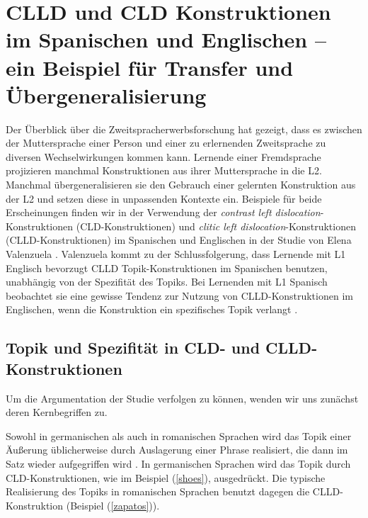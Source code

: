 \section{CLLD und CLD Konstruktionen im Spanischen und Englischen -- ein Beispiel für Transfer und Übergeneralisierung}


Der Überblick über die Zweitspracherwerbsforschung hat gezeigt, dass es zwischen der Muttersprache einer Person und einer zu erlernenden Zweitsprache zu diversen Wechselwirkungen kommen kann.
Lernende einer Fremdsprache projizieren manchmal Konstruktionen aus ihrer Muttersprache in die L2.
Manchmal übergeneralisieren sie den Gebrauch einer gelernten Konstruktion aus der L2 und setzen diese in unpassenden Kontexte ein.
Beispiele für beide Erscheinungen finden wir in der Verwendung der \textit{contrast left dislocation}-Konstruktionen (CLD-Konstruktionen) und \textit{clitic left dislocation}-Konstruktionen (CLLD-Konstruktionen) im Spanischen und Englischen in der Studie von Elena Valenzuela \cite{Valenzuela05}.
Valenzuela kommt zu der Schlussfolgerung, dass Lernende mit L1 Englisch bevorzugt CLLD Topik-Konstruktionen im Spanischen benutzen, unabhängig von der Spezifität des Topiks.
Bei Lernenden mit L1 Spanisch beobachtet sie eine gewisse Tendenz zur Nutzung von CLLD-Konstruktionen im Englischen, wenn die Konstruktion ein spezifisches Topik verlangt \cite{Valenzuela05}.




\subsection{Topik und Spezifität in CLD- und CLLD-Konstruktionen}
Um die Argumentation der Studie \cite{Valenzuela05} verfolgen zu können, wenden wir uns zunächst deren Kernbegriffen zu.

Sowohl in germanischen als auch in romanischen Sprachen wird das Topik einer Äußerung üblicherweise durch Auslagerung einer Phrase realisiert, die dann im Satz wieder aufgegriffen wird \cite{Valenzuela05}.
In germanischen Sprachen wird das Topik durch CLD-Konstruktionen, wie im Beispiel (\ref{shoes}), ausgedrückt.
Die typische Realisierung des Topiks in romanischen Sprachen benutzt dagegen die CLLD-Konstruktion (Beispiel (\ref{zapatos})).

